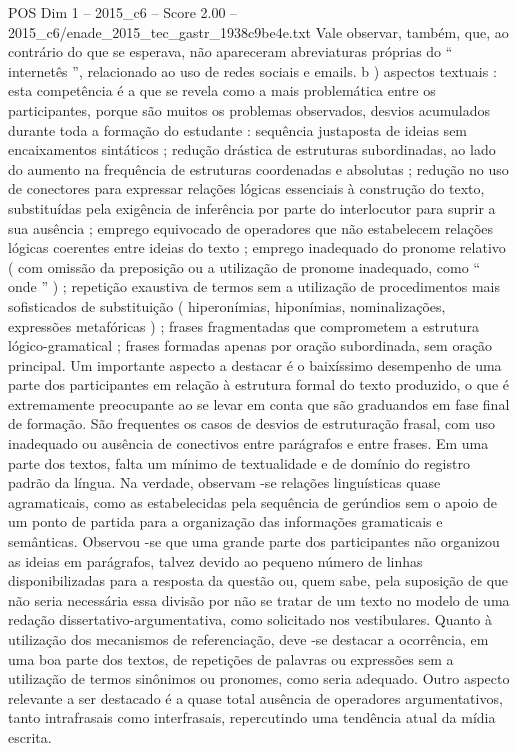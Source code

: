 \begin{textsample}{POS Dim 1 – 2015\_c6 – Score 2.00 – 2015\_c6/enade\_2015\_tec\_gastr\_1938c9be4e.txt}
Vale observar, também, que, ao contrário do que se esperava, não apareceram abreviaturas próprias do “ internetês ”, relacionado ao uso de redes sociais e emails. b ) aspectos textuais : esta competência é a que se revela como a mais problemática entre os participantes, porque são muitos os problemas observados, desvios acumulados durante toda a formação do estudante : sequência justaposta de ideias sem encaixamentos sintáticos ; redução drástica de estruturas subordinadas, ao lado do aumento na frequência de estruturas coordenadas e absolutas ; redução no uso de conectores para expressar relações lógicas essenciais à construção do texto, substituídas pela exigência de inferência por parte do interlocutor para suprir a sua ausência ; emprego equivocado de operadores que não estabelecem relações lógicas coerentes entre ideias do texto ; emprego inadequado do pronome relativo ( com omissão da preposição ou a utilização de pronome inadequado, como “ onde ” ) ; repetição exaustiva de termos sem a utilização de procedimentos mais sofisticados de substituição ( hiperonímias, hiponímias, nominalizações, expressões metafóricas ) ; frases fragmentadas que comprometem a estrutura lógico-gramatical ; frases formadas apenas por oração subordinada, sem oração principal.
Um importante aspecto a destacar é o baixíssimo desempenho de uma parte dos participantes em relação à estrutura formal do texto produzido, o que é extremamente preocupante ao se levar em conta que são graduandos em fase final de formação.
São frequentes os casos de desvios de estruturação frasal, com uso inadequado ou ausência de conectivos entre parágrafos e entre frases.
Em uma parte dos textos, falta um mínimo de textualidade e de domínio do registro padrão da língua.
Na verdade, observam -se relações linguísticas quase agramaticais, como as estabelecidas pela sequência de gerúndios sem o apoio de um ponto de partida para a organização das informações gramaticais e semânticas.
Observou -se que uma grande parte dos participantes não organizou as ideias em parágrafos, talvez devido ao pequeno número de linhas disponibilizadas para a resposta da questão ou, quem sabe, pela suposição de que não seria necessária essa divisão por não se tratar de um texto no modelo de uma redação dissertativo-argumentativa, como solicitado nos vestibulares.
Quanto à utilização dos mecanismos de referenciação, deve -se destacar a ocorrência, em uma boa parte dos textos, de repetições de palavras ou expressões sem a utilização de termos sinônimos ou pronomes, como seria adequado.
Outro aspecto relevante a ser destacado é a quase total ausência de operadores argumentativos, tanto intrafrasais como interfrasais, repercutindo uma tendência atual da mídia escrita.

\end{textsample}
